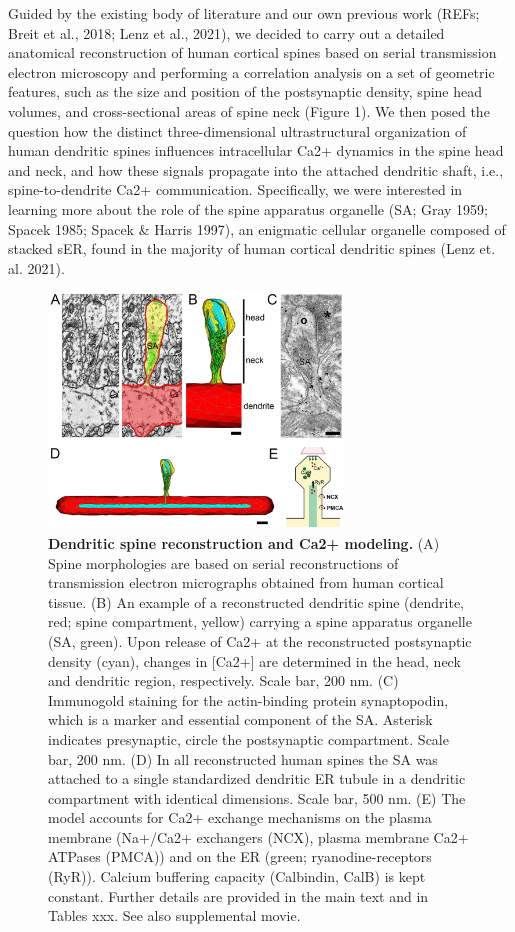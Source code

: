 \documentclass[fleqn,12pt]{wlscirep}
\begin{document}
	Guided by the existing body of literature and our own previous work (REFs; Breit et al., 2018; Lenz et al., 2021), we decided to carry out a detailed anatomical reconstruction of human cortical spines based on serial transmission electron microscopy and performing a correlation analysis on a set of geometric features, such as the size and position of the postsynaptic density, spine head volumes, and cross-sectional areas of spine neck (Figure 1). We then posed the question how the distinct three-dimensional ultrastructural organization of human dendritic spines influences intracellular Ca2+ dynamics in the spine head and neck, and how these signals propagate into the attached dendritic shaft, i.e., spine-to-dendrite Ca2+ communication. Specifically, we were interested in learning more about the role of the spine apparatus organelle (SA; Gray 1959; Spacek 1985; Spacek \& Harris 1997), an enigmatic cellular organelle composed of stacked sER, found in the majority of human cortical dendritic spines (Lenz et. al. 2021).

\begin{figure}[h!]
\centering
\includegraphics[width=0.7\textwidth]{images/figure1.png}
\caption{{\small\textbf{Dendritic spine reconstruction and Ca2+ modeling.} (A) Spine morphologies are based on serial reconstructions of transmission electron micrographs obtained from human cortical tissue. (B) An example of a reconstructed dendritic spine (dendrite, red; spine compartment, yellow) carrying a spine apparatus organelle (SA, green). Upon release of Ca2+ at the reconstructed postsynaptic density (cyan), changes in [Ca2+] are determined in the head, neck and dendritic region, respectively. Scale bar, 200 nm. (C) Immunogold staining for the actin-binding protein synaptopodin, which is a marker and essential component of the SA. Asterisk indicates presynaptic, circle the postsynaptic  compartment. Scale bar, 200 nm. (D) In all reconstructed human spines the SA was attached to a single standardized dendritic ER tubule in a dendritic compartment with identical dimensions. Scale bar, 500 nm. (E) The model accounts for Ca2+ exchange mechanisms on the plasma membrane (Na+/Ca2+ exchangers (NCX), plasma membrane Ca2+ ATPases (PMCA)) and on the ER (green; ryanodine-receptors (RyR)). Calcium buffering capacity (Calbindin, CalB) is kept constant. Further details are provided in the main text and in Tables xxx. See also supplemental movie.}}
\end{figure}
\end{document}
